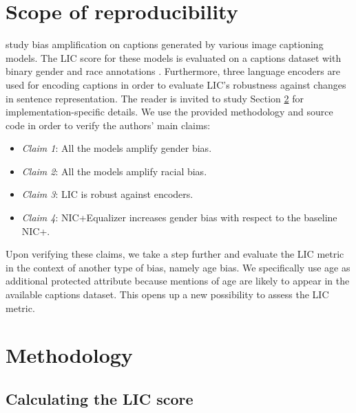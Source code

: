 \section{Scope of reproducibility}
\label{sec:scope}
\citeauthor{hirota} study bias amplification on captions generated by various image captioning models. %
The LIC score for these models is evaluated on a captions dataset with binary gender and race annotations \cite{annotations}. Furthermore, three language encoders \cite{bert, lstm} 
are used for encoding captions in order to evaluate LIC's robustness against changes in sentence representation. The reader is invited to study Section \ref{sec:methods} for implementation-specific details. We use the provided methodology and source code in order to verify the authors' main claims:

\begin{itemize}
    \item \textit{Claim 1}: All the models amplify gender bias.
    \item \textit{Claim 2}: All the models amplify racial bias.
    \item \textit{Claim 3}: LIC is robust against encoders.
    \item \textit{Claim 4}: NIC+Equalizer increases gender bias with respect to the baseline NIC+.
\end{itemize}

Upon verifying these claims, 
we take a step further and evaluate the LIC metric in the context of another type of bias, namely age bias. We specifically use age as additional protected attribute because mentions of age are likely to appear in the available captions dataset. This opens up a new possibility to assess the LIC metric. 

\section{Methodology}
\label{sec:methods}

\subsection{Calculating the LIC score}

